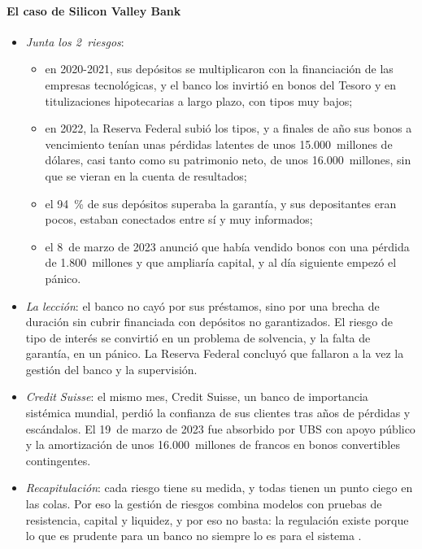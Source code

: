 \documentclass[11pt]{article}
\begin{document}
\paragraph{El caso de Silicon Valley Bank}

\begin{itemize}
\item \emph{Junta los 2~riesgos}:
  \begin{itemize}
  \item en 2020-2021, sus depósitos se multiplicaron con la financiación de las empresas tecnológicas, y el banco los invirtió en bonos del Tesoro y en titulizaciones hipotecarias a largo plazo, con tipos muy bajos\nocite{FED2023SVB};
  \item en 2022, la Reserva Federal subió los tipos, y a finales de año sus bonos a vencimiento tenían unas pérdidas latentes de unos 15.000~millones de dólares, casi tanto como su patrimonio neto, de unos 16.000~millones, sin que se vieran en la cuenta de resultados\nocite{SVB2023Form10K};
  \item el 94~\% de sus depósitos superaba la garantía, y sus depositantes eran pocos, estaban conectados entre sí y muy informados\nocite{FED2023SVB};
  \item el 8~de marzo de 2023 anunció que había vendido bonos con una pérdida de 1.800~millones y que ampliaría capital, y al día siguiente empezó el pánico\nocite{FED2023SVB}.
  \end{itemize}
\item \emph{La lección}: el banco no cayó por sus préstamos, sino por una brecha de duración sin cubrir financiada con depósitos no garantizados. El riesgo de tipo de interés se convirtió en un problema de solvencia, y la falta de garantía, en un pánico. La Reserva Federal concluyó que fallaron a la vez la gestión del banco y la supervisión\nocite{FED2023SVB}.
\item \emph{Credit Suisse}: el mismo mes, Credit Suisse, un banco de importancia sistémica mundial, perdió la confianza de sus clientes tras años de pérdidas y escándalos. El 19~de marzo de 2023 fue absorbido por UBS con apoyo público y la amortización de unos 16.000~millones de francos en bonos convertibles contingentes\nocite{FINMA2023CSUBS}.
\end{itemize}

\begin{itemize}
\item \emph{Recapitulación}: cada riesgo tiene su medida, y todas tienen un punto ciego en las colas. Por eso la gestión de riesgos combina modelos con pruebas de resistencia, capital y liquidez, y por eso no basta: la regulación existe porque lo que es prudente para un banco no siempre lo es para el sistema .
\end{itemize}
\end{document}
